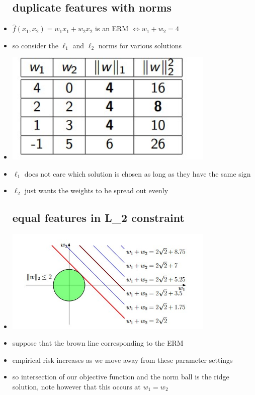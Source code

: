 \documentclass{article}
\begin{document}
\begin{itemize}
\subsection{duplicate features with norms}
\item $\hat{f}(x_1,x_2)=w_1x_1+w_2x_2$ is an ERM $\iff w_1+w_2=4$
\item so consider the $\ell_{1}$ and $\ell_{2}$ norms for various solutions 
\item \includegraphics[width=10cm]{labs/lab_3/images/r3_1.jpg}
\item $\ell_{1}$ does not care which solution is chosen as long as they have the same sign 
\item $\ell_{2}$ just wants the weights to be spread out evenly 
\subsection{equal features in L_2 constraint }
\item \includegraphics[width=10cm]{labs/lab_3/images/r3_2.jpg}
\item suppose that the brown line corresponding to the ERM
\item empirical risk increases as we move away from these parameter settings 
\item so intersection of our objective function and the norm ball is the ridge solution, note however that this occurs at $w_1=w_2$

\end{itemize}
\end{document}
